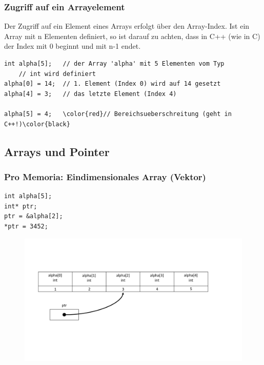 \subsubsection{Zugriff auf ein Arrayelement}
\label{sec:Zugriff auf ein Arrayelement}
\begin{hinweis}
Der Zugriff auf ein Element eines Arrays erfolgt über den Array-Index. Ist ein Array mit n Elementen definiert, so ist darauf zu achten, dass in C++ (wie in C) der Index mit 0 beginnt und mit n-1 endet.
\end{hinweis}
\noindent
\begin{minipage}{\linewidth}
\begin{lstlisting}
int alpha[5];	// der Array 'alpha' mit 5 Elementen vom Typ
	// int wird definiert
alpha[0] = 14;	// 1. Element (Index 0) wird auf 14 gesetzt
alpha[4] = 3;	// das letzte Element (Index 4)

alpha[5] = 4;	\color{red}// Bereichsueberschreitung (geht in C++!)\color{black}
\end{lstlisting}
\end{minipage}


\subsection{Arrays und Pointer}
\label{sec:Arrays und Pointer}

\subsubsection{Pro Memoria: Eindimensionales Array (Vektor)}
\label{sec:Pro Memoria: Eindimensionales Array (Vektor)}
\noindent
\begin{minipage}{\linewidth}
\begin{lstlisting}
int alpha[5];
int* ptr;
ptr = &alpha[2];
*ptr = 3452;
\end{lstlisting}
\end{minipage}

\begin{figure}[h]
	\centering
	\includegraphics[width=\linewidth]{images/pointer9.pdf}
\end{figure}

